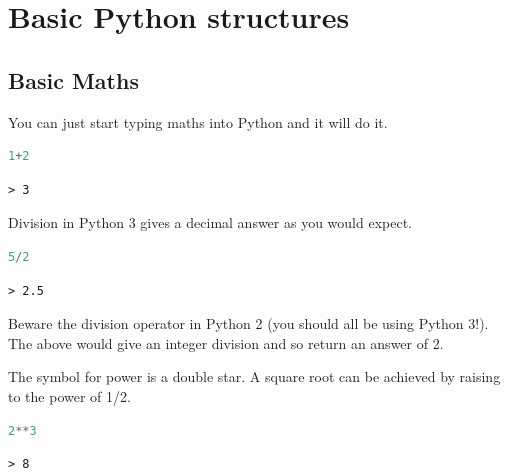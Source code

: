 \section{Basic Python structures}
	\subsection{Basic Maths}
You can just start typing maths into Python and it will do it.
		\begin{lstlisting}[language=Python]
1+2\end{lstlisting}
		\begin{verbatim}> 3\end{verbatim}
		
Division in Python 3 gives a decimal answer as you would expect.
		\begin{lstlisting}[language=Python]
5/2\end{lstlisting}
		\begin{verbatim}> 2.5\end{verbatim}

		Beware the division operator in Python 2 (you should all be using Python 3!). The above would give an integer division and so return an answer of 2.
		
		The symbol for power is a double star. A square root can be achieved by raising to the power of 1/2.
		\begin{lstlisting}[language=Python]
2**3\end{lstlisting}
		\begin{verbatim}> 8\end{verbatim}

